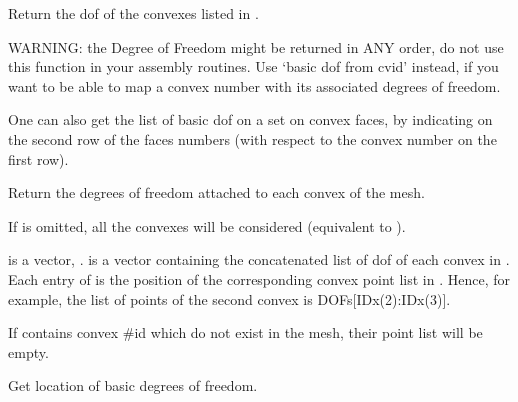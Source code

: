 \documentclass[a4paper,11pt,english]{sphinxmanual}
\begin{document}
\begin{fulllineitems}
\begin{fulllineitems}
\label{\detokenize{python/cmdref_MeshFem:getfem.MeshFem.basic_dof_from_cv}}
Return the dof of the convexes listed in .

WARNING: the Degree of Freedom might be returned in ANY order, do
not use this function in your assembly routines. Use ‘basic dof from cvid’
instead, if you want to be able to map a convex number with its
associated degrees of freedom.

One can also get the list of basic dof on a set on convex faces, by
indicating on the second row of  the faces numbers (with
respect to the convex number on the first row).

\end{fulllineitems}


\begin{fulllineitems}
\label{\detokenize{python/cmdref_MeshFem:getfem.MeshFem.basic_dof_from_cvid}}
Return the degrees of freedom attached to each convex of the mesh.

If  is omitted, all the convexes will be considered (equivalent
to ).

 is a vector, .
 is a vector containing the concatenated list
of dof of each convex in . Each entry of  is the position
of the corresponding convex point list in . Hence, for example,
the list of points of the second convex is DOFs{[}IDx(2):IDx(3){]}.

If  contains convex \#id which do not exist in the mesh, their
point list will be empty.

\end{fulllineitems}


\begin{fulllineitems}
\label{\detokenize{python/cmdref_MeshFem:getfem.MeshFem.basic_dof_nodes}}
Get location of basic degrees of freedom.


\end{fulllineitems}
\end{fulllineitems}
\end{document}

